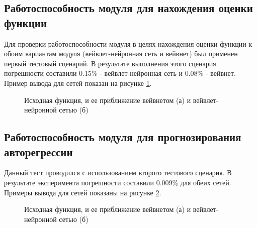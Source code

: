 \documentclass[utf8,usehyperref,14pt]{G7-32}
\begin{document}
\subsection{Работоспособность модуля для нахождения оценки функции}
Для проверки работоспособности модуля в целях нахождения оценки функции к обоим вариантам модуля (вейвлет-нейронная сеть и вейвнет) был применен первый тестовый сценарий. В результате выполнения этого сценария погрешности составили 0.15\% - вейвлет-нейронная сеть и 0.08\% - вейвнет. Пример вывода для сетей показан на рисунке \ref{test_1_result}.
\begin{figure}[h]
\begin{minipage}[h]{0.49\linewidth}
\end{minipage}
\hfill
\begin{minipage}[h]{0.49\linewidth}
\end{minipage}
\caption{Исходная функция, и ее приближение вейвнетом (а) и вейвлет-нейронной сетью (б)}
\label{test_1_result}
\end{figure}
\subsection{Работоспособность модуля для прогнозирования авторегрессии}
Данный тест проводился с использованием второго тестового сценария. В результате эксперимента погрешности составили 0.009\% для обеих сетей. Примеры вывода для сетей показаны на рисунке \ref{test_2_result}.
\begin{figure}[h]
\begin{minipage}[h]{0.49\linewidth}
\end{minipage}
\hfill
\begin{minipage}[h]{0.49\linewidth}
\end{minipage}
\caption{Исходная функция, и ее приближение вейвнетом (а) и вейвлет-нейронной сетью (б)}
\label{test_2_result}
\end{figure}
\end{document}
